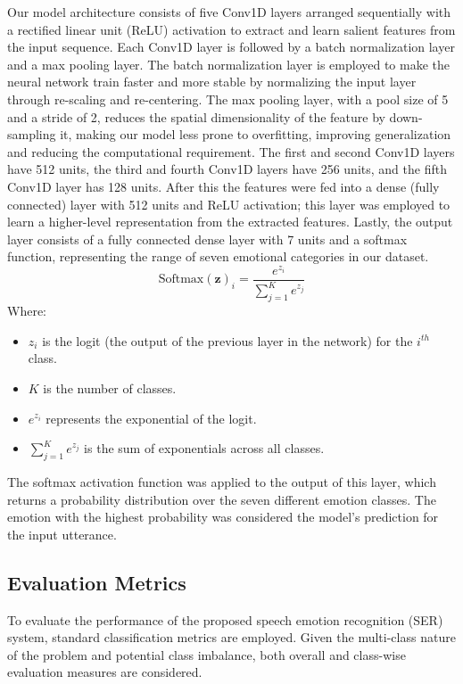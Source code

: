 \documentclass[iicol,sn-mathphys-num]{sn-jnl}%
\theoremstyle{thmstyleone}%
\theoremstyle{thmstyletwo}%
\theoremstyle{thmstylethree}%
\begin{document}
Our model architecture consists of five Conv1D layers arranged sequentially with a rectified linear unit (ReLU) activation to extract and learn salient features from the input sequence. Each Conv1D layer is followed by a batch normalization layer and a max pooling layer. The batch normalization layer is employed to make the neural network train faster and more stable by normalizing the input layer through re-scaling and re-centering. The max pooling layer, with a pool size of 5 and a stride of 2, reduces the spatial dimensionality of the feature by down-sampling it, making our model less prone to overfitting, improving generalization and reducing the computational requirement. The first and second Conv1D layers have 512 units, the third and fourth Conv1D layers have 256 units, and the fifth Conv1D layer has 128 units. After this the features were fed into a dense (fully connected) layer with 512 units and ReLU activation; this layer was employed to learn a higher-level representation from the extracted features. Lastly, the output layer consists of a fully connected dense layer with 7 units and a softmax function, representing the range of seven emotional categories in our dataset.
\begin{equation}
\text{Softmax}(\mathbf{z})_i = \frac{e^{z_i}}{\sum_{j=1}^{K} e^{z_j}}
\end{equation}
\noindent Where:
\begin{itemize}
    \item $z_i$ is the logit (the output of the previous layer in the network) for the $i^{th}$ class.
    \item $K$ is the number of classes.
    \item $e^{z_i}$ represents the exponential of the logit.
    \item $\sum_{j=1}^{K} e^{z_j}$ is the sum of exponentials across all classes.
\end{itemize}
\noindent The softmax activation function was applied to the output of this layer, which returns a probability distribution over the seven different emotion classes. The emotion with the highest probability was considered the model's prediction for the input utterance.

\fi

\subsection{Evaluation Metrics}\label{subsec3.5}

To evaluate the performance of the proposed speech emotion recognition (SER) system, standard classification metrics are employed. Given the multi-class nature of the problem and potential class imbalance, both overall and class-wise evaluation measures are considered.
\end{document}
